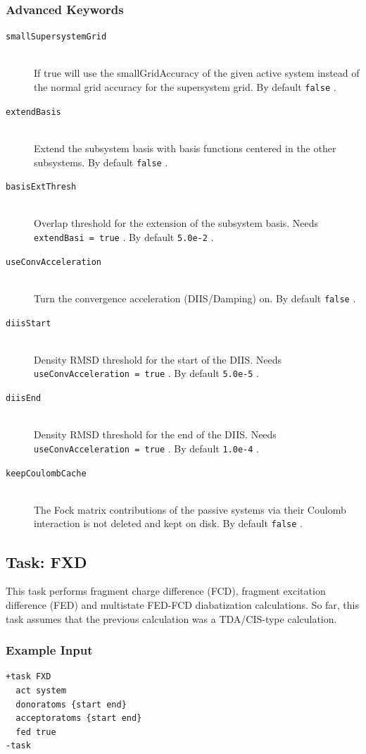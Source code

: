\documentclass[bibliography=totocnumbered,a4paper,10pt,oneside]{scrbook}
\newcommand{\ttt}[1]{%
  \begingroup\setlength{\fboxsep}{1pt}%
  \colorbox{serenity-green!30}{\texttt{\hspace*{2pt}\vphantom{(g}#1\hspace*{2pt}}}%
  \endgroup
}
\begin{document}
\subsubsection{Advanced Keywords}
\begin{description}
	\item [\texttt{smallSupersystemGrid}]\hfill \\
	If true will use the smallGridAccuracy of the given active system instead of the normal grid accuracy for the supersystem grid. By default \ttt{false}.
	\item [\texttt{extendBasis}]\hfill \\
	Extend the subsystem basis with basis functions centered in the other subsystems. By default \ttt{false}.
	\item [\texttt{basisExtThresh}]\hfill \\
	Overlap threshold for the extension of the subsystem basis. Needs \ttt{extendBasi = true}. By default \ttt{5.0e-2}.
	\item [\texttt{useConvAcceleration}]\hfill \\
	Turn the convergence acceleration (DIIS/Damping) on. By default \ttt{false}.
	\item [\texttt{diisStart}]\hfill \\
	Density RMSD threshold for the start of the DIIS. Needs \ttt{useConvAcceleration = true}. By default \ttt{5.0e-5}.
	\item [\texttt{diisEnd}]\hfill \\
	Density RMSD threshold for the end of the DIIS. Needs \ttt{useConvAcceleration = true}. By default \ttt{1.0e-4}.
	\item [\texttt{keepCoulombCache}]\hfill \\
	The Fock matrix contributions of the passive systems via their Coulomb interaction is not deleted and kept on disk. By default \ttt{false}.
\end{description}
\subsection{Task: FXD}
\label{sec:FXD}
This task performs fragment charge difference (FCD), fragment excitation difference (FED) and multistate FED-FCD diabatization calculations.
So far, this task assumes that the previous calculation was a TDA/CIS-type calculation. 
\subsubsection{Example Input}
\begin{lstlisting}
+task FXD
  act system
  donoratoms {start end}
  acceptoratoms {start end}
  fed true
-task
\end{lstlisting}
\end{document}
